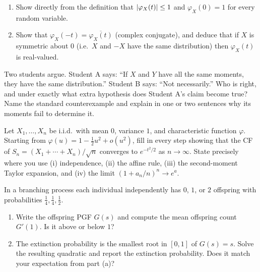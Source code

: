 \begin{exercise}[CF basics]
\label{ch18:ex-cf-basics}
\begin{enumerate}[label=(\alph*)]
  \item Show directly from the definition that $\lvert\varphi_X(t)\rvert\le 1$ and
        $\varphi_X(0)=1$ for every random variable.
  \item Show that $\varphi_X(-t)=\overline{\varphi_X(t)}$ (complex conjugate),
        and deduce that if $X$ is symmetric about $0$ (i.e.\ $X$ and $-X$ have
        the same distribution) then $\varphi_X(t)$ is real-valued.
\end{enumerate}
\end{exercise}

\begin{exercise}
\label{ch18:ex-uniqueness}
Two students argue. Student A says: ``If $X$ and $Y$ have all the same moments,
they have the same distribution.'' Student B says: ``Not necessarily.'' Who is
right, and under exactly what extra hypothesis does Student A's claim become
true? Name the standard counterexample and explain in one or two sentences why
its moments fail to determine it.
\end{exercise}

\begin{exercise}
\label{ch18:ex-clt}
Let $X_1,\dots,X_n$ be i.i.d.\ with mean $0$, variance $1$, and characteristic
function $\varphi$. Starting from $\varphi(u)=1-\tfrac12 u^2 + o(u^2)$, fill in
every step showing that the CF of $S_n=(X_1+\cdots+X_n)/\sqrt n$ converges to
$e^{-t^2/2}$ as $n\to\infty$. State precisely where you use (i) independence,
(ii) the affine rule, (iii) the second-moment Taylor expansion, and (iv) the
limit $(1+a_n/n)^n\to e^a$.
\end{exercise}

\begin{exercise}
\label{ch18:ex-branching}
In a branching process each individual independently has $0$, $1$, or $2$
offspring with probabilities $\tfrac14,\tfrac14,\tfrac12$.
\begin{enumerate}[label=(\alph*)]
  \item Write the offspring PGF $G(s)$ and compute the mean offspring count
        $G'(1)$. Is it above or below $1$?
  \item The extinction probability is the smallest root in $[0,1]$ of
        $G(s)=s$. Solve the resulting quadratic and report the extinction
        probability. Does it match your expectation from part (a)?
\end{enumerate}
\end{exercise}

